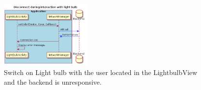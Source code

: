 \documentclass[a4paper]{article}
\begin{document}
\begin{figure}[H]
    \centering
    \includegraphics[width=0.4\textwidth]{seq3.png}
    \caption{Switch on Light bulb with the user located in the LightbulbView and the backend is unresponsive.}
    \label{fig:seq3}
\end{figure}
	
\end{document}

